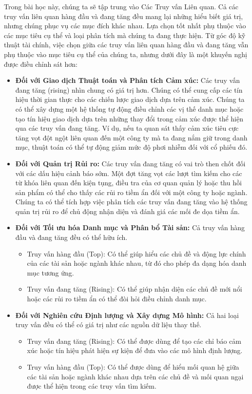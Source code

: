 Trong bài học này, chúng ta sẽ tập trung vào Các Truy vấn Liên quan. Cả các truy vấn liên quan hàng đầu và đang tăng đều mang lại những hiểu biết giá trị, nhưng chúng phục vụ các mục đích khác nhau. Lựa chọn tốt nhất phụ thuộc vào các mục tiêu cụ thể và loại phân tích mà chúng ta đang thực hiện. Từ góc độ kỹ thuật tài chính, việc chọn giữa các truy vấn liên quan hàng đầu và đang tăng vẫn phụ thuộc vào mục tiêu cụ thể của chúng ta, nhưng dưới đây là một khuyến nghị được điều chỉnh sát hơn:

\begin{itemize}
  \item \textbf{Đối với Giao dịch Thuật toán và Phân tích Cảm xúc:} Các truy vấn đang tăng (rising) nhìn chung có giá trị hơn. Chúng có thể cung cấp các tín hiệu thời gian thực cho các chiến lược giao dịch dựa trên cảm xúc. Chúng ta có thể xây dựng một hệ thống tự động điều chỉnh các vị thế danh mục hoặc tạo tín hiệu giao dịch dựa trên những thay đổi trong cảm xúc được thể hiện qua các truy vấn đang tăng. Ví dụ, nếu ta quan sát thấy cảm xúc tiêu cực tăng vọt đột ngột liên quan đến một công ty mà ta đang nắm giữ trong danh mục, thuật toán có thể tự động giảm mức độ phơi nhiễm đối với cổ phiếu đó.

  \item \textbf{Đối với Quản trị Rủi ro:} Các truy vấn đang tăng có vai trò then chốt đối với các dấu hiệu cảnh báo sớm. Một đợt tăng vọt các lượt tìm kiếm cho các từ khóa liên quan đến kiện tụng, điều tra của cơ quan quản lý hoặc thu hồi sản phẩm có thể cho thấy các rủi ro tiềm ẩn đối với một công ty hoặc ngành. Chúng ta có thể tích hợp việc phân tích các truy vấn đang tăng vào hệ thống quản trị rủi ro để chủ động nhận diện và đánh giá các mối đe dọa tiềm ẩn.

  \item \textbf{Đối với Tối ưu hóa Danh mục và Phân bổ Tài sản:} Cả truy vấn hàng đầu và đang tăng đều có thể hữu ích.
  \begin{itemize}
    \item Truy vấn hàng đầu (Top): Có thể giúp hiểu các chủ đề và động lực chính của các tài sản hoặc ngành khác nhau, từ đó cho phép đa dạng hóa danh mục tương ứng.
    \item Truy vấn đang tăng (Rising): Có thể giúp nhận diện các chủ đề mới nổi hoặc các rủi ro tiềm ẩn có thể đòi hỏi điều chỉnh danh mục.
  \end{itemize}

  \item \textbf{Đối với Nghiên cứu Định lượng và Xây dựng Mô hình:} Cả hai loại truy vấn đều có thể có giá trị như các nguồn dữ liệu thay thế.
  \begin{itemize}
    \item Truy vấn đang tăng (Rising): Có thể được dùng để tạo các chỉ báo cảm xúc hoặc tín hiệu phát hiện sự kiện để đưa vào các mô hình định lượng.
    \item Truy vấn hàng đầu (Top): Có thể được dùng để hiểu mối quan hệ giữa các tài sản hoặc ngành khác nhau dựa trên các chủ đề và mối quan ngại được thể hiện trong các truy vấn tìm kiếm.
  \end{itemize}
\end{itemize}

